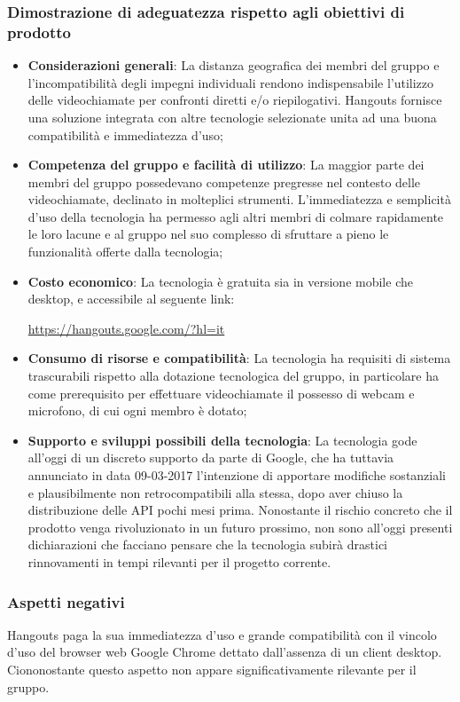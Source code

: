 \documentclass[./../Technology Baseline.tex]{subfiles}
\begin{document}
\subsubsection{Dimostrazione di adeguatezza rispetto agli obiettivi di prodotto}
\begin{itemize}
	\item \textbf{Considerazioni generali}: La distanza geografica dei membri del gruppo e l'incompatibilità degli impegni individuali rendono indispensabile l'utilizzo delle videochiamate per confronti diretti e/o riepilogativi. Hangouts fornisce una soluzione integrata con altre tecnologie selezionate unita ad una buona compatibilità e immediatezza d'uso;
	\item \textbf{Competenza del gruppo e facilità di utilizzo}: La maggior parte dei membri del gruppo possedevano competenze pregresse nel contesto delle videochiamate, declinato in molteplici strumenti. L'immediatezza e semplicità d'uso della tecnologia ha permesso agli altri membri di colmare rapidamente le loro lacune e al gruppo nel suo complesso di sfruttare a pieno le funzionalità offerte dalla tecnologia;
	\item \textbf{Costo economico}: La tecnologia è gratuita sia in versione mobile che desktop, e accessibile al seguente link:
	\begin{center}
		\url{https://hangouts.google.com/?hl=it}
	\end{center}
	\item \textbf{Consumo di risorse e compatibilità}: La tecnologia ha requisiti di sistema trascurabili rispetto alla dotazione tecnologica del gruppo, in particolare ha come prerequisito per effettuare videochiamate il possesso di webcam e microfono, di cui ogni membro è dotato;
	\item \textbf{Supporto e sviluppi possibili della tecnologia}: La tecnologia gode all'oggi di un discreto supporto da parte di Google, che ha tuttavia annunciato in data 09-03-2017 l'intenzione di apportare modifiche sostanziali e plausibilmente non retrocompatibili alla stessa, dopo aver chiuso la distribuzione delle API pochi mesi prima. Nonostante il rischio concreto che il prodotto venga rivoluzionato in un futuro prossimo, non sono all'oggi presenti dichiarazioni che facciano pensare che la tecnologia subirà drastici rinnovamenti in tempi rilevanti per il progetto corrente.
\end{itemize}

\subsubsection{Aspetti negativi}
Hangouts paga la sua immediatezza d'uso e grande compatibilità con il vincolo d'uso del browser web Google Chrome dettato dall'assenza di un client desktop. Ciononostante questo aspetto non appare significativamente rilevante per il gruppo.
\end{document}
